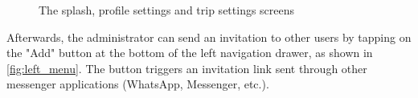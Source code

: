 \documentclass[11pt,a4paper,oneside]{article}
\begin{document}
\begin{figure}[H]
    \centering
    \qquad
    \qquad
    \caption{The splash, profile settings and trip settings screens }%
    \label{fig:profile_trip_settings}%
\end{figure}

Afterwards, the administrator can send an invitation to other users by tapping on the "Add" button at the bottom of the left navigation drawer, as shown in \autoref{fig:left_menu}. The button triggers an invitation link sent through other messenger applications (WhatsApp, Messenger, etc.).
\end{document}
